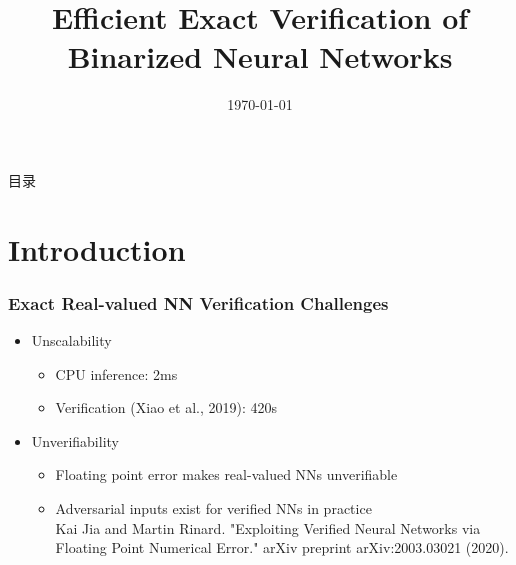 \documentclass[aspectratio=169%
,serif,mathserif]{beamer}
\begin{document}
\title{Efficient Exact Verification of Binarized Neural Networks} %
\institute[LZU] %
{	
}
	\CTEXoptions[today=old]
	\date{\today} %
\begin{frame}[plain]\vspace{1.5em}
\titlepage\vspace{-0.5cm}
\end{frame}
\begin{frame}{目录}
\tableofcontents
\end{frame}

\section{Introduction} %
\begin{frame}
	\frametitle{Exact Real-valued NN Verification Challenges}
	\begin{itemize}
		\item Unscalability
		\begin{itemize}		
			\item CPU inference: 2ms
			\item Verification (Xiao et al., 2019): 420s  
		\end{itemize}
		\item Unverifiability
		\begin{itemize}
			\item Floating point error makes real-valued NNs unverifiable
			\item Adversarial inputs exist for verified NNs in practice \\
			Kai Jia and Martin Rinard. "Exploiting Verified Neural Networks via Floating Point Numerical Error." arXiv preprint arXiv:2003.03021 (2020).
		\end{itemize}
	\end{itemize}

\end{frame}
\end{document}
